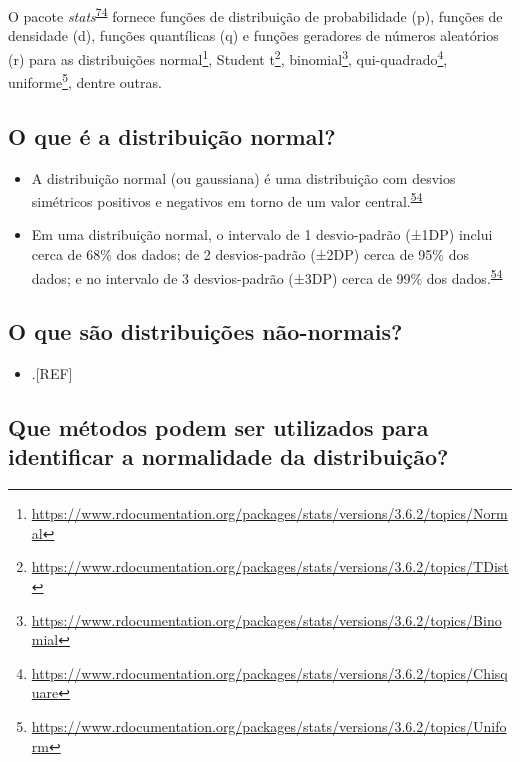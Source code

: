 \documentclass[
  a4paper,
]{book}
\providecommand{\tightlist}{%
  \setlength{\itemsep}{0pt}\setlength{\parskip}{0pt}}
\renewcommand{\href}[2]{#2\footnote{\url{#1}}}
\newenvironment{infobox}[1]
  {
  \begin{itemize}
  \renewcommand{\labelitemi}{
    \raisebox{-.7\height}[0pt][0pt]{
      {\setkeys{Gin}{width=3em,keepaspectratio}
        \texttt{[image: \#1]}}
    }
  }
  \setlength{\fboxsep}{1em}
  \begin{blackbox}
  \item
  }
  {
  \end{blackbox}
  \end{itemize}
  }
\begin{document}
\begin{infobox}{images/Rlogo}
O pacote \emph{stats}\textsuperscript{\protect\hyperlink{ref-stats-3}{74}} fornece funções de distribuição de probabilidade (p), funções de densidade (d), funções quantílicas (q) e funções geradores de números aleatórios (r) para as distribuições \href{https://www.rdocumentation.org/packages/stats/versions/3.6.2/topics/Normal}{normal}, \href{https://www.rdocumentation.org/packages/stats/versions/3.6.2/topics/TDist}{Student t}, \href{https://www.rdocumentation.org/packages/stats/versions/3.6.2/topics/Binomial}{binomial}, \href{https://www.rdocumentation.org/packages/stats/versions/3.6.2/topics/Chisquare}{qui-quadrado}, \href{https://www.rdocumentation.org/packages/stats/versions/3.6.2/topics/Uniform}{uniforme}, dentre outras.

\end{infobox}

\hypertarget{o-que-uxe9-a-distribuiuxe7uxe3o-normal}{%
\subsection{O que é a distribuição normal?}\label{o-que-uxe9-a-distribuiuxe7uxe3o-normal}}

\begin{itemize}
\item
  A distribuição normal (ou gaussiana) é uma distribuição com desvios simétricos positivos e negativos em torno de um valor central.\textsuperscript{\protect\hyperlink{ref-Ali2016}{54}}
\item
  Em uma distribuição normal, o intervalo de 1 desvio-padrão (±1DP) inclui cerca de 68\% dos dados; de 2 desvios-padrão (±2DP) cerca de 95\% dos dados; e no intervalo de 3 desvios-padrão (±3DP) cerca de 99\% dos dados.\textsuperscript{\protect\hyperlink{ref-Ali2016}{54}}
\end{itemize}

\hypertarget{o-que-suxe3o-distribuiuxe7uxf5es-nuxe3o-normais}{%
\subsection{O que são distribuições não-normais?}\label{o-que-suxe3o-distribuiuxe7uxf5es-nuxe3o-normais}}

\begin{itemize}
\tightlist
\item
  .{[}REF{]}
\end{itemize}

\hypertarget{que-muxe9todos-podem-ser-utilizados-para-identificar-a-normalidade-da-distribuiuxe7uxe3o}{%
\subsection{Que métodos podem ser utilizados para identificar a normalidade da distribuição?}\label{que-muxe9todos-podem-ser-utilizados-para-identificar-a-normalidade-da-distribuiuxe7uxe3o}}
\end{document}

